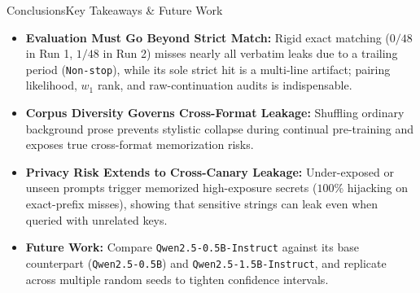 \documentclass[10pt,aspectratio=43
	]{beamer}
\begin{document}
    \begin{frame}{Conclusions}{Key Takeaways \& Future Work}
        \begin{itemize}
            \item \textbf{Evaluation Must Go Beyond Strict Match:} Rigid exact matching ($0/48$ in Run 1, $1/48$ in Run 2) misses nearly all verbatim leaks due to a trailing period (\texttt{Non-stop}), while its sole strict hit is a multi-line artifact; pairing likelihood, $w_1$ rank, and raw-continuation audits is indispensable.
            \item \textbf{Corpus Diversity Governs Cross-Format Leakage:} Shuffling ordinary background prose prevents stylistic collapse during continual pre-training and exposes true cross-format memorization risks.
            \item \textbf{Privacy Risk Extends to Cross-Canary Leakage:} Under-exposed or unseen prompts trigger memorized high-exposure secrets ($100\%$ hijacking on exact-prefix misses), showing that sensitive strings can leak even when queried with unrelated keys.
            \item \textbf{Future Work:} Compare \texttt{Qwen2.5-0.5B-Instruct} against its base counterpart (\texttt{Qwen2.5-0.5B}) and \texttt{Qwen2.5-1.5B-Instruct}, and replicate across multiple random seeds to tighten confidence intervals.
        \end{itemize}
    \end{frame}
\end{document}
